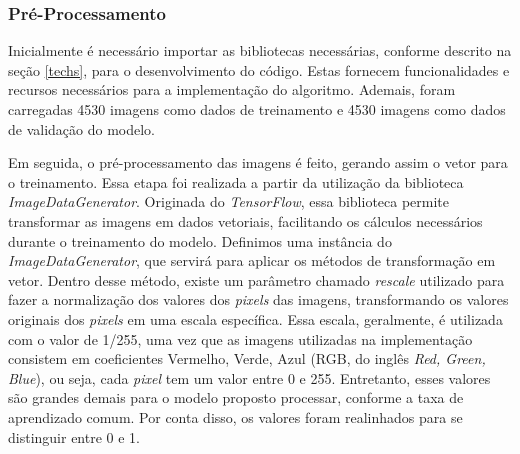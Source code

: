 


\subsubsection{\esp Pré-Processamento} \label{preprocess}
Inicialmente é necessário importar as bibliotecas necessárias, conforme descrito na seção \ref{techs}, para o desenvolvimento do código. Estas fornecem funcionalidades e recursos necessários para a implementação do algoritmo. Ademais, foram carregadas 4530 imagens como dados de treinamento e 4530 imagens como dados de validação do modelo.

Em seguida, o pré-processamento das imagens é feito, gerando assim o vetor para o treinamento. Essa etapa foi realizada a partir da utilização da biblioteca \textit{ImageDataGenerator}. Originada do \textit{TensorFlow}, essa biblioteca permite transformar as imagens em dados vetoriais, facilitando os cálculos necessários durante o treinamento do modelo. Definimos uma instância do \textit{ImageDataGenerator}, que servirá para aplicar os métodos de transformação em vetor. Dentro desse método, existe um parâmetro chamado \textit{rescale} utilizado para fazer a normalização dos valores dos \textit{pixels} das imagens, transformando os valores originais dos \textit{pixels} em uma escala específica. Essa escala, geralmente, é utilizada com o valor de 1/255, uma vez que as imagens utilizadas na implementação consistem em coeficientes Vermelho, Verde, Azul (RGB, do inglês \textit{Red, Green, Blue}), ou seja, cada \textit{pixel} tem um valor entre 0 e 255. Entretanto, esses valores são grandes demais para o modelo proposto processar, conforme a taxa de aprendizado comum. Por conta disso, os valores foram realinhados para se distinguir entre 0 e 1.



